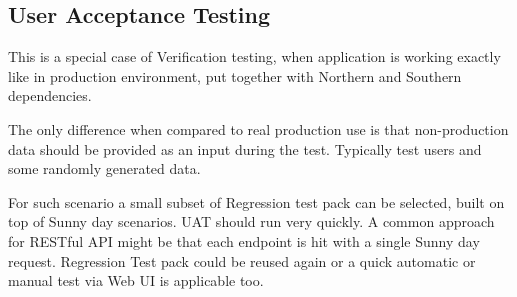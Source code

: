 	\subsection{User Acceptance Testing}
	
	This is a special case of Verification testing, when application is working exactly like in production environment, put
	together with Northern and Southern dependencies.
	
	The only difference when compared to real production use is that non-production data should be provided as an input
	during the test. Typically test users and some randomly generated data.
	
	For such scenario a small subset of Regression test pack can be selected, built on top of Sunny day scenarios.
	UAT should run very quickly. A common approach for RESTful API might be that each endpoint is hit with a single Sunny
	day request. Regression Test pack could be reused again or a quick automatic or manual test via Web UI is applicable
	too.

